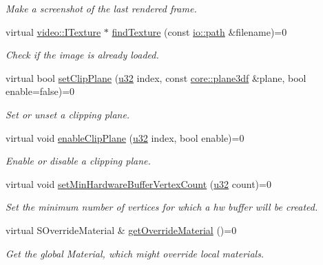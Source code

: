 \begin{DoxyCompactItemize}
\begin{DoxyCompactList}\small\item\em Make a screenshot of the last rendered frame. \end{DoxyCompactList}\item 
virtual \hyperlink{classirr_1_1video_1_1ITexture}{video\+::\+I\+Texture} $\ast$ \hyperlink{classirr_1_1video_1_1IVideoDriver_ad4eaed6d56b092e6805400ca59795de9}{find\+Texture} (const \hyperlink{namespaceirr_1_1io_a6468281622ce3a1c46b72e19f32dded5}{io\+::path} \&filename)=0
\begin{DoxyCompactList}\small\item\em Check if the image is already loaded. \end{DoxyCompactList}\item 
virtual bool \hyperlink{classirr_1_1video_1_1IVideoDriver_a959ac385891941e7ec8d99b2f105b265}{set\+Clip\+Plane} (\hyperlink{namespaceirr_a0416a53257075833e7002efd0a18e804}{u32} index, const \hyperlink{namespaceirr_1_1core_a97c9b39d4c6f71dbd9ded0153c4fa7f7}{core\+::plane3df} \&plane, bool enable=false)=0
\begin{DoxyCompactList}\small\item\em Set or unset a clipping plane. \end{DoxyCompactList}\item 
virtual void \hyperlink{classirr_1_1video_1_1IVideoDriver_aaaf9567c759f866311c76e3874822339}{enable\+Clip\+Plane} (\hyperlink{namespaceirr_a0416a53257075833e7002efd0a18e804}{u32} index, bool enable)=0
\begin{DoxyCompactList}\small\item\em Enable or disable a clipping plane. \end{DoxyCompactList}\item 
virtual void \hyperlink{classirr_1_1video_1_1IVideoDriver_a79cbd1329b4206503e9a9593592502ea}{set\+Min\+Hardware\+Buffer\+Vertex\+Count} (\hyperlink{namespaceirr_a0416a53257075833e7002efd0a18e804}{u32} count)=0
\begin{DoxyCompactList}\small\item\em Set the minimum number of vertices for which a hw buffer will be created. \end{DoxyCompactList}\item 
virtual S\+Override\+Material \& \hyperlink{classirr_1_1video_1_1IVideoDriver_af119ebfd02f99f77a463007277abf14a}{get\+Override\+Material} ()=0
\begin{DoxyCompactList}\small\item\em Get the global Material, which might override local materials. \end{DoxyCompactList}\item 

\end{DoxyCompactItemize}
